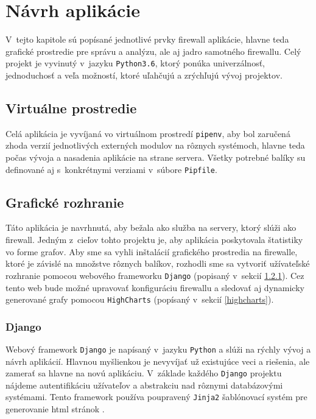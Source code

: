 \chapter{Návrh aplikácie}
\label{app-design}

	V~tejto kapitole sú popísané jednotlivé prvky firewall aplikácie, hlavne teda grafické prostredie 
	pre správu a analýzu, ale aj jadro samotného firewallu. Celý projekt je vyvinutý v~jazyku \texttt{Python3.6},
	ktorý ponúka univerzálnosť, jednoduchosť a veľa možností, ktoré uľahčujú a zrýchľujú vývoj projektov.

	\section{Virtuálne prostredie}
	\label{pipenv}
		Celá aplikácia je vyvíjaná vo virtuálnom prostredí \texttt{pipenv}, aby bol zaručená zhoda verzií 
		jednotlivých externých modulov na rôznych systémoch, hlavne teda počas vývoja a nasadenia aplikácie
		na strane servera. Všetky potrebné balíky su definované aj s~konkrétnymi verziami v~súbore \texttt{Pipfile}.

	\section{Grafické rozhranie}
	\label{gui}
		Táto aplikácia je navrhnutá, aby bežala ako služba na servery, ktorý slúži ako firewall. Jedným
		z~cieľov tohto projektu je, aby aplikácia poskytovala štatistiky vo forme grafov. Aby sme sa vyhli
		inštalácií grafického prostredia na firewalle, ktoré je závislé na množstve rôznych balíkov, rozhodli
		sme sa vytvoriť užívateľské rozhranie pomocou webového frameworku \texttt{Django} (popisaný v~sekcií
		\ref{django}). Cez tento web bude možné upravovať konfiguráciu firewallu a sledovať aj dynamicky 
		generované grafy pomocou \texttt{HighCharts} (popísaný v~sekcií \ref{highcharts}).

		\subsection{Django}
		\label{django}
			Webový framework \texttt{Django} je napísaný v~jazyku \texttt{Python} a slúži na rýchly vývoj 
			a návrh aplikácií. Hlavnou myšlienkou je nevyvíjať už existujúce veci a riešenia, ale zamerať
			sa hlavne na novú aplikáciu. V~základe každého \texttt{Django} projektu nájdeme autentifikáciu
			užívateľov a abstrakciu nad rôznymi databázovými systémami. Tento framework používa poupravený 
			\texttt{Jinja2} šablónovací systém pre generovanie html stránok \cite{django}.
		
